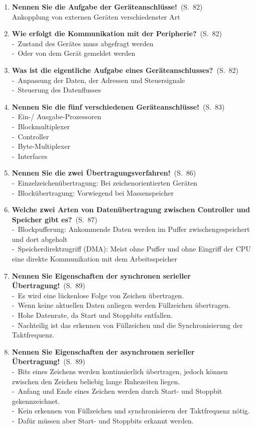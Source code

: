 \documentclass[a4paper,12pt]{article}
\newcommand{\question}[3]{\pagebreak[3]\item {\textbf{#1?}}\ (S.\ #2)#3}
\newcommand{\statement}[3]{\pagebreak[3]\item {\textbf{#1!}}\ (S.\ #2)#3}
\newcommand{\catchword}[1]{\\-\ #1}
\newcommand{\normaltext}[1]{\\#1}
\newcommand{\page}[1]{#1}
\begin{document}
\begin{enumerate}
  \statement{Nennen Sie die Aufgabe der Geräteanschlüsse}{\page{82}}
  {
    \normaltext{Ankopplung von externen Geräten verschiedenster Art}
  }

  \question{Wie erfolgt die Kommunikation mit der Peripherie}{\page{82}}
  {
    \catchword{Zustand des Gerätes muss abgefragt werden}
    \catchword{Oder von dem Gerät gemeldet werden}
  }

  \question{Was ist die eigentliche Aufgabe eines Geräteanschlusses}{\page{82}}
  {
    \catchword{Anpassung der Daten, der Adressen und Steuersignale}
    \catchword{Steuerung des Datenflusses}
  }

  \statement{Nennen Sie die fünf verschiedenen Geräteanschlüsse}{\page{83}}
  {
    \catchword{Ein-/ Ausgabe-Prozessoren}
    \catchword{Blockmultiplexer}
    \catchword{Controller}
    \catchword{Byte-Multiplexer}
    \catchword{Interfaces}
  }

  \statement{Nennen Sie die zwei Übertragungsverfahren}{\page{86}}
  {
    \catchword{Einzelzeichenübertragung: Bei zeichenorientierten Geräten}
    \catchword{Blockübertragung: Vorwiegend bei Massenspeicher}
  }

  \question{Welche zwei Arten von Datenübertragung zwischen Controller und Speicher gibt es}{\page{87}}
  {
    \catchword{Blockpufferung: Ankommende Daten werden im Puffer zwischengespeichert und dort abgeholt}
    \catchword{Speicherdirektzugriff (DMA): Meist ohne Puffer und ohne Eingriff der CPU eine
               direkte Kommunikation mit dem Arbeitsspeicher}
  }


  \statement{Nennen Sie Eigenschaften der synchronen serieller Übertragung}{\page{89}}
  {
    \catchword{Es wird eine lückenlose Folge von Zeichen übertragen.}
    \catchword{Wenn keine aktuellen Daten anliegen werden Füllzeichen übertragen.}
    \catchword{Hohe Datenrate, da Start und Stoppbits entfallen.}
    \catchword{Nachteilig ist das erkennen von Füllzeichen und die Synchronisierung der Taktfrequenz.}
  }
  
  \statement{Nennen Sie Eigenschaften der asynchronen serieller Übertragung}{\page{89}}
  {
    \catchword{Bits eines Zeichens werden kontinuierlich übertragen, jedoch können zwischen den Zeichen
    beliebig lange Ruhezeiten liegen.}
    \catchword{Anfang und Ende eines Zeichen werden durch Start- und Stoppbit gekennzeichnet.}
    \catchword{Kein erkennen von Füllzeichen und synchronisieren der Taktfrequenz nötig.}
    \catchword{Dafür müssen aber Start- und Stoppbits erkannt werden.}
  }
  

\end{enumerate}
\end{document}
